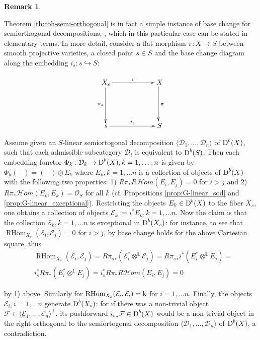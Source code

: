 \documentclass[sn-mathphys-num]{sn-jnl}%
\newcommand{\Oo}{\mathcal O}
\newcommand{\Ff}{\mathcal F}
\newcommand{\Ee}{\mathcal E}
\newcommand{\D}{\mathcal D}
\newcommand*{\Dd}{\mathop{\mathrm D\kern0pt}\nolimits}
\newcommand*{\RHom}{\mathop{\mathrm {RHom}}\nolimits}
\theoremstyle{definition}
\newtheorem{remark}[theorem]{Remark}
\begin{document}
\begin{remark}\label{rem:basechangeG-to-point}
{\rm Theorem \ref{th:coh-semi-orthogonal} is in fact a simple instance of base change for semiorthogonal decompositions, \cite{Kuzbasech}, which in this particular case can be stated in elementary terms. In more detail, consider a flat morphism $\pi\colon X\rightarrow S$ between smooth projective varieties, a closed point $s\in S$ and the base change diagram along the embedding $i_s\colon s\hookrightarrow S$:

\begin{figure}[H]
$$\xymatrix @C5pc @R4pc {
X_s\ar[r]^i\ar@<-0.1ex>[d]_{\pi _s} & X \ar@<-0.4ex>[d]^{\pi} \\
       s\ar[r]^{i_s} & S}
$$
\end{figure}

Assume given an $S$-linear semiortogonal decomposition $\langle \D _1,\dots ,\D _n\rangle$ of $\Dd ^b(X)$, such that each admissible subcategory $\D _i$ is equivalent to $\Dd ^b(S)$. Then each embedding functor $\Phi _k:\D _k\rightarrow \Dd ^b(X), k=1,\dots,n$ is given by $\Phi _k(-)=(-)\otimes E_k$ where $E_k,k=1,\dots n$ is a collection of objects of $\Dd ^b(X)$ with the following two properties: 1) $R\pi _{\ast}R{\mathcal Hom}(E_i,E_j)=0$ for $i>j$ and 2) $R\pi _{\ast}{\mathcal Hom}(E_k,E_k)=\Oo _S$ for all $k$ (cf. Propositions \ref{prop:G-linear_sod} and \ref{prop:G-linear_exceptional}). Restricting the objects $E _k\in \Dd ^b(X)$ to the fiber $X_s$, one obtains a collection of objects $\Ee _k:=i^{\ast}E_k, k=1,\dots n$. Now the claim is that the collection $\Ee _k, k=1,\dots n$ is exceptional in $\Dd ^b(X_s)$: for instance, to see that $\RHom _{X_s}(\Ee _i,\Ee _j)=0$ for $i>j$, by \cite[Lemma 2.32]{KuzHPD} base change holds for the above Cartesian square, thus \
\begin{eqnarray}
&\RHom _{X_s}(\Ee _i,\Ee _j)=R{\pi _s}_{\ast}(\Ee _i^{\ast}\otimes ^{\mathbb L}\Ee _j)=R{\pi _s}_{\ast}i^{\ast}(E_i^{\ast}\otimes ^{\mathbb L}E _j)= \\
& i^{\ast}_sR\pi _{\ast}(E_i^{\ast}\otimes ^{\mathbb L}E _j)=i^{\ast}_sR\pi _{\ast}R{\mathcal Hom}(E_i,E_j)=0
\end{eqnarray}

by 1) above. Similarly for $\RHom _{X_s}(\Ee _i,\Ee _i)={\sf k}$ for $i=1,\dots n$. Finally, the objects $\Ee _i,i=1,\dots n$ generate $\Dd ^b(X_s)$: for if there was a non-trivial object $\Ff \in \langle \Ee _1,\dots ,\Ee _n\rangle  ^{\perp}$, its pushforward ${i_s}_{\ast}\Ff \in \Dd ^b(X)$ would be a non-trivial object in the right orthogonal to the semiortogonal decomposition $\langle \D _1,\dots ,\D _n\rangle$ of $\Dd ^b(X)$, a contradiction.
}
\end{remark}
\end{document}

